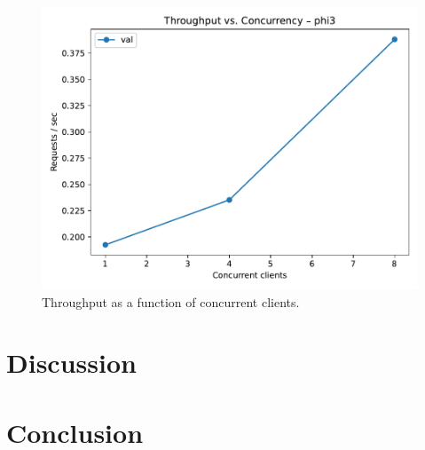 \documentclass[conference]{IEEEtran}
\begin{document}
\begin{figure}[t]
  \centering
  \includegraphics[width=\linewidth]{throughput_vs_c}
  \caption{Throughput as a function of concurrent clients.}
  \label{fig:throughput}
\end{figure}

\section{Discussion}\label{sec:discussion}

\section{Conclusion}\label{sec:conclusion}



\end{document}

